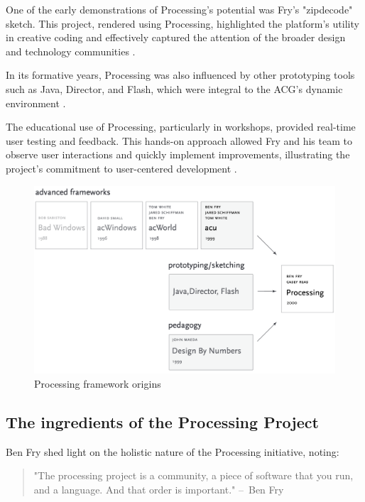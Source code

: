 One of the early demonstrations of Processing's potential was Fry's "zipdecode" sketch. This project, rendered using Processing, highlighted the platform's utility in creative coding and effectively captured the attention of the broader design and technology communities \parencite{AppleScienceProfiles2011} \parencite{fryZipdecode1999}.


In its formative years, Processing was also influenced by other prototyping tools such as Java, Director, and Flash, which were integral to the ACG's dynamic environment \parencite[23]{fryComputationalInformationDesign2004}. 

The educational use of Processing, particularly in workshops, provided real-time user testing and feedback. This hands-on approach allowed Fry and his team to observe user interactions and quickly implement improvements, illustrating the project's commitment to user-centered development \parencite{fryEmailInterviewProcessing2023}.

\begin{figure}
  \centering
  \includegraphics[width=1\textwidth]{images/fry2004-frameworks.png} 
  \caption{Processing framework origins \parencite[23]{fryComputationalInformationDesign2004}}
  \label{fig:processing_framework_inspirations}
\end{figure}

\subsection{The ingredients of the Processing Project}

Ben Fry shed light on the holistic nature of the Processing initiative, noting:
\begin{quote}
"The processing project is a community, a piece of software that you run, and a language. And that order is important." – Ben Fry \parencite[19:22]{artsatmit2017CASTSymposium2017}
\end{quote}

